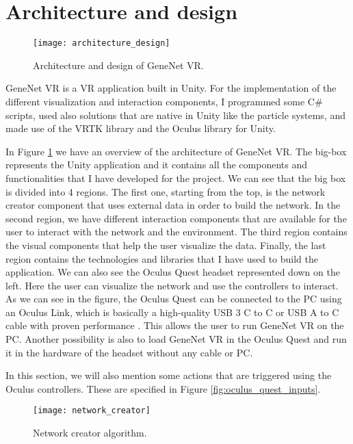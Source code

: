 \section{Architecture and design}

\begin{figure}[h!]
    \centering%
    \texttt{[image: architecture\_design]}
    \caption{Architecture and design of GeneNet VR.}
    \label{fig:architecture_design}
\end{figure}%

GeneNet VR is a VR application built in Unity. For the implementation of the different visualization and interaction components, I programmed some C\# scripts, used also solutions that are native in Unity like the particle systems, and made use of the VRTK library and the Oculus library for Unity.

In Figure \ref{fig:architecture_design} we have an overview of the architecture of GeneNet VR. The big-box represents the Unity application and it contains all the components and functionalities that I have developed for the project. We can see that the big box is divided into 4 regions. The first one, starting from the top, is the network creator component that uses external data in order to build the network. In the second region, we have different interaction components that are available for the user to interact with the network and the environment. The third region contains the visual components that help the user visualize the data. Finally, the last region contains the technologies and libraries that I have used to build the application. We can also see the Oculus Quest headset represented down on the left. Here the user can visualize the network and use the controllers to interact. As we can see in the figure, the Oculus Quest can be connected to the PC using an Oculus Link, which is basically a high-quality USB 3 C to C or USB A to C cable with proven performance \cite{oculus_link}. This allows the user to run GeneNet VR on the PC. Another possibility is also to load GeneNet VR in the Oculus Quest and run it in the hardware of the headset without any cable or PC.

In this section, we will also mention some actions that are triggered using the Oculus controllers. These are specified in Figure \ref{fig:oculus_quest_inputs}.

\begin{figure}[h!]
    \centering%
    \texttt{[image: network\_creator]}
    \caption{Network creator algorithm.}
    \label{fig:network_creator}
\end{figure}%

